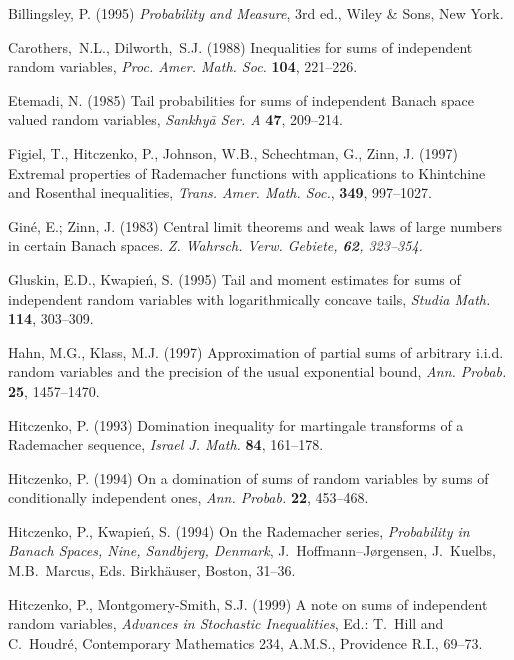 \documentclass[12pt]{article}
\begin{document}
\begin{thebibliography}{99}


 Billingsley, P. (1995) {\em Probability and Measure}, 3rd ed.,
Wiley \& Sons, New York.

 Carothers,~N.L., Dilworth,~S.J. (1988) Inequalities for sums
of
independent random variables, {\em Proc. Amer. Math. Soc.} {\bf 104},
221--226.

 Etemadi, N. (1985) Tail probabilities for sums of independent
Banach space valued random variables, {\em Sankhy\=a Ser. A} {\bf
47},  209--214.

 Figiel, T., Hitczenko, P., Johnson, W.B., Schechtman,
G., Zinn,
J. (1997)  Extremal properties of Ra\-de\-ma\-cher functions with
applications to Khintchine and Rosenthal inequalities, {\em Trans. Amer. 
Math. Soc.}, {\bf 349}, 997--1027.

 Gin\'e, E.; Zinn, J. (1983) 
Central limit theorems and weak laws of large numbers in certain Banach spaces. 
{\em Z. Wahrsch. Verw. Gebiete, {\bf 62}, 323--354.}

 Gluskin, E.D., Kwapie\'n, S. 
(1995) Tail and moment estimates for sums of independent random
variables with logarithmically concave tails, {\em Studia Math.} {\bf
114}, 
303--309.

 Hahn, M.G., Klass, M.J. (1997) Approximation of partial
sums of 
arbitrary i.i.d. random variables and the precision of the usual
exponential  bound, {\em Ann. Probab.} {\bf 25}, 1457--1470.

 Hitczenko, P. (1993) Domination inequality for martingale 
transforms of a Rademacher sequence, {\em Israel J. Math.} {\bf 84}, 
161--178.

 Hitczenko, P. (1994) On a domination of 
sums of random variables by sums of conditionally independent ones,
{\em Ann. Probab.} {\bf 22}, 453--468.

 Hitczenko, P., Kwapie\'n, S. (1994) On the Rademacher 
series, {\em Probability in Banach Spaces, Nine, Sandbjerg, Denmark},
J.~Hoffmann--J{\o}rgensen, J.~Kuelbs, M.B.~Marcus, Eds. Birkh\"auser,
Boston, 31--36.

 Hitczenko, P., Montgomery-Smith, S.J. (1999)
A note on sums of independent random variables,
{\em Advances in Stochastic Inequalities}, Ed.: T.~Hill and C.~Houdr\'e,
Contemporary Mathematics 234, A.M.S., Providence R.I., 69--73.


\end{thebibliography}
\end{document}
